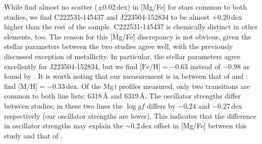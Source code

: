 \documentclass{emulateapj}
\begin{document}
While \citet{wylie-de-boer;et-al_2012} find almost no scatter {($\pm0.02$\,dex)} in [Mg/Fe] for stars common to both studies, we find {C222531-145437} and {J223504-152834} to be almost {$+0.20$\,dex} higher than the rest of the sample. C222531-145437 is chemically distinct in other elements, too. The reason for this [Mg/Fe] discrepancy is not obvious, given the stellar parameters between the two studies agree well, with the previously discussed exception of metallicity. In particular, the stellar parameters agree excellently for {J223504-152834}, but we find {$\mbox{[Fe/H]} = -0.63$} instead of $-0.98$ as found by \citet{wylie-de-boer;et-al_2012}. It is worth noting that our measurement is in between that of \citet{williams;et-al_2011} and \citet{wylie-de-boer;et-al_2012}: \citet{williams;et-al_2011} find [M/H]$= -0.33$\,dex.  Of the {Mg\,\textsc{i}} profiles measured, only two transitions are common to both line lists: {6318\,\AA} and {6319\,\AA}. The oscillator strengths differ between studies; in these two lines the $\log{gf}$ differs by $-0.24$ and {$-0.27$\,dex} respectively (our oscillator strengths are lower). This indicates that the difference in oscillator strengths may explain the $\sim{}$0.2\,dex offset in [Mg/Fe] between this study and that of \citet{wylie-de-boer;et-al_2012}.

\end{document}
